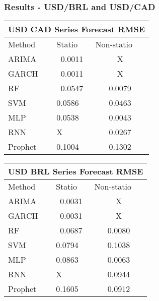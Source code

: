 \documentclass{beamer}
\begin{document}
	\begin{frame}
	\frametitle{Results - USD/BRL and USD/CAD}	
	\begin{table}
		\parbox{.45\linewidth}{
			\centering
			\begin{tabular}{|lll|}
				\hline
				\multicolumn{3}{|c|}{USD CAD Series Forecast RMSE}                                                  \\ \hline
				\multicolumn{1}{|l|}{Method}  & \multicolumn{1}{l|}{Statio} & Non-statio             \\ \hline
				\multicolumn{1}{|l|}{ARIMA}   & \multicolumn{1}{c|}{0.0011}       & \multicolumn{1}{c|}{X} \\ \hline
				\multicolumn{1}{|l|}{GARCH}   & \multicolumn{1}{c|}{0.0011}       & \multicolumn{1}{c|}{X} \\ \hline
				\multicolumn{1}{|l|}{RF}      & \multicolumn{1}{c|}{0.0547}       & \multicolumn{1}{c|}{0.0079}  \\ \hline
				\multicolumn{1}{|l|}{SVM}     & \multicolumn{1}{l|}{0.0586}       & \multicolumn{1}{c|}{0.0463}  \\ \hline
				\multicolumn{1}{|l|}{MLP}     & \multicolumn{1}{l|}{0.0538}       & \multicolumn{1}{c|}{0.0043}  \\ \hline
				\multicolumn{1}{|l|}{RNN}     & \multicolumn{1}{l|}{X}       & \multicolumn{1}{c|}{0.0267}  \\ \hline
				\multicolumn{1}{|l|}{Prophet} & \multicolumn{1}{l|}{0.1004}       & \multicolumn{1}{c|}{0.1302}  \\ \hline
			\end{tabular}
			
		}
		\hfill
		\parbox{.45\linewidth}{
			\centering
			\begin{tabular}{|lll|}
				\hline
				\multicolumn{3}{|c|}{USD BRL Series Forecast RMSE}                                                  \\ \hline
				\multicolumn{1}{|l|}{Method}  & \multicolumn{1}{l|}{Statio} & Non-statio             \\ \hline
				\multicolumn{1}{|l|}{ARIMA}   & \multicolumn{1}{c|}{0.0031}       & \multicolumn{1}{c|}{X} \\ \hline
				\multicolumn{1}{|l|}{GARCH}   & \multicolumn{1}{c|}{0.0031}       & \multicolumn{1}{c|}{X} \\ \hline
				\multicolumn{1}{|l|}{RF}      & \multicolumn{1}{c|}{0.0687}       & \multicolumn{1}{c|}{0.0080}  \\ \hline
				\multicolumn{1}{|l|}{SVM}     & \multicolumn{1}{l|}{0.0794}       & \multicolumn{1}{c|}{0.1038}  \\ \hline
				\multicolumn{1}{|l|}{MLP}     & \multicolumn{1}{l|}{0.0863}       & \multicolumn{1}{c|}{0.0063}  \\ \hline
				\multicolumn{1}{|l|}{RNN}     & \multicolumn{1}{l|}{X}       & \multicolumn{1}{c|}{0.0944}  \\ \hline
				\multicolumn{1}{|l|}{Prophet} & \multicolumn{1}{l|}{0.1605}       & \multicolumn{1}{c|}{0.0912}  \\ \hline
			\end{tabular}
			
}
\end{table}
\end{frame}
\end{document}
